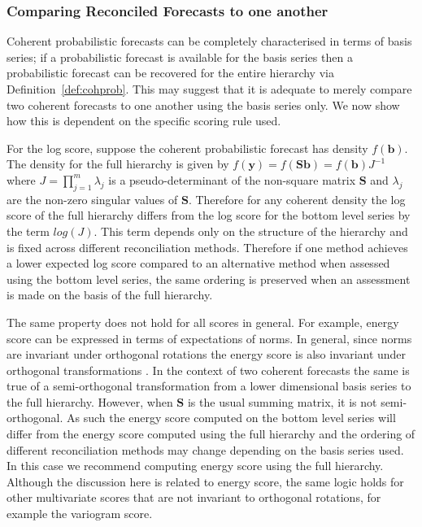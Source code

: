 \documentclass[a4paper, 11pt]{article}
\theoremstyle{theo}
\theoremstyle{definition}
\begin{document}
\subsubsection{Comparing Reconciled Forecasts to one another}

Coherent probabilistic forecasts can be completely characterised in terms of basis series; if a probabilistic forecast is  available for the basis series then a probabilistic forecast can be recovered for  the  entire hierarchy via Definition~\ref{def:cohprob}. This may suggest that it is adequate to merely compare two coherent forecasts to  one  another using  the basis series only.  We now show how this is  dependent on the specific scoring rule used.

For the log score, suppose the coherent probabilistic forecast has density $f(\bm{b})$.  The density for the full hierarchy is given by $f(\bm{y})=f(\bm{Sb})=f(\bm{b})J^{-1}$ where $J=\prod_{j=1}^{m}\lambda_j$ is a pseudo-determinant of the non-square  matrix ${\bm S}$ and $\lambda_j$ are the non-zero singular values of ${\bm S}$.  Therefore for any coherent density the log score of the full hierarchy differs from the log score for the bottom level series by the term $log(J)$.  This term depends  only on the structure of the  hierarchy and is fixed across different reconciliation methods.  Therefore if one method achieves a lower expected log score compared to an alternative method  when assessed using the bottom level series, the same ordering is preserved when an assessment is made on the basis of the full hierarchy.

The same property does not hold for all scores in general.  For example, energy score can be expressed in terms of expectations of norms.  In general, since norms are invariant under orthogonal rotations the energy score is also invariant under orthogonal transformations \citep{Szekely2013,Gneiting2007}.  In the context of two coherent forecasts the same is true of a semi-orthogonal transformation from a lower dimensional basis series to the full hierarchy.  However,  when ${\bm S}$ is  the usual summing matrix, it is not semi-orthogonal.  As such the energy score computed on the bottom level series will differ from the energy score computed using the full hierarchy and the ordering of different reconciliation methods may change depending on the basis series used.  In this case we recommend computing energy score using the full hierarchy.  Although the discussion here is related to energy score, the same logic holds for other multivariate scores that are not invariant to orthogonal rotations, for example the variogram score.
\end{document}
